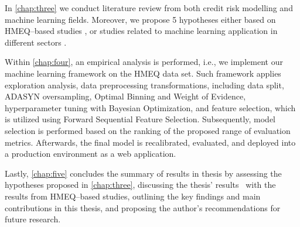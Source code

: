 In \autoref{chap:three} we conduct literature review from both credit risk modelling and machine learning fields. Moreover, we propose 5 hypotheses either based on HMEQ--based studies \citep{serkan2021bagging, zurada2014classification}, or studies related to machine learning application in different sectors \citep{de2023predicting, pintelas2020grey, wu2018accurate}.


Within \autoref{chap:four}, an empirical analysis is performed, i.e., we implement our machine learning framework on the HMEQ data set.
Such framework applies exploration analysis, data preprocessing transformations, including data split, ADASYN oversampling, Optimal Binning and Weight of Evidence, hyperparameter tuning with Bayesian Optimization, and feature selection, which is utilized using Forward Sequential Feature Selection.
Subsequently, model selection is performed based on the ranking of the proposed range of evaluation metrics.
Afterwards, the final model is recalibrated, evaluated, and deployed into a production environment as a web application.


Lastly, \autoref{chap:five} concludes the summary of results in thesis by assessing the hypotheses proposed in \autoref{chap:three}, discussing the thesis' results  with the results from HMEQ--based studies, outlining the key findings and main contributions in this thesis, and proposing the author's recommendations for future research.

